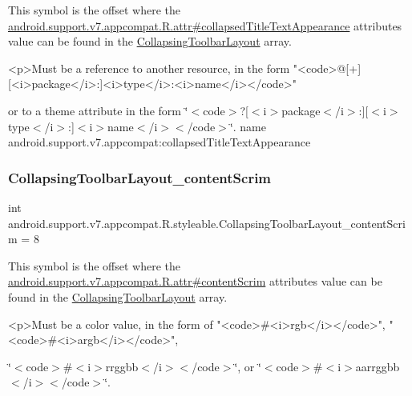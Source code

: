 This symbol is the offset where the \hyperlink{classandroid_1_1support_1_1v7_1_1appcompat_1_1R_1_1attr_af75636f95be73b48d5c2fc97f0f5cba5}{android.\+support.\+v7.\+appcompat.\+R.\+attr\#collapsed\+Title\+Text\+Appearance} attribute\textquotesingle{}s value can be found in the \hyperlink{classandroid_1_1support_1_1v7_1_1appcompat_1_1R_1_1styleable_a8d282d917f35e5a08dd37db243410383}{Collapsing\+Toolbar\+Layout} array.

\begin{DoxyVerb}      <p>Must be a reference to another resource, in the form "<code>@[+][<i>package</i>:]<i>type</i>:<i>name</i></code>"
\end{DoxyVerb}
 or to a theme attribute in the form \char`\"{}$<$code$>$?\mbox{[}$<$i$>$package$<$/i$>$\+:\mbox{]}\mbox{[}$<$i$>$type$<$/i$>$\+:\mbox{]}$<$i$>$name$<$/i$>$$<$/code$>$\char`\"{}.  name android.\+support.\+v7.\+appcompat\+:collapsed\+Title\+Text\+Appearance \mbox{\label{classandroid_1_1support_1_1v7_1_1appcompat_1_1R_1_1styleable_a9bd6e1eb8c17d8f0f33567b77c829a5a}} 
\subsubsection{\texorpdfstring{Collapsing\+Toolbar\+Layout\+\_\+content\+Scrim}{CollapsingToolbarLayout\_contentScrim}}
{\footnotesize\ttfamily int android.\+support.\+v7.\+appcompat.\+R.\+styleable.\+Collapsing\+Toolbar\+Layout\+\_\+content\+Scrim = 8\hspace{0.3cm}{\ttfamily [static]}}

This symbol is the offset where the \hyperlink{classandroid_1_1support_1_1v7_1_1appcompat_1_1R_1_1attr_ab524c966b3d2b0e493bd1b4a72aca159}{android.\+support.\+v7.\+appcompat.\+R.\+attr\#content\+Scrim} attribute\textquotesingle{}s value can be found in the \hyperlink{classandroid_1_1support_1_1v7_1_1appcompat_1_1R_1_1styleable_a8d282d917f35e5a08dd37db243410383}{Collapsing\+Toolbar\+Layout} array.

\begin{DoxyVerb}      <p>Must be a color value, in the form of "<code>#<i>rgb</i></code>", "<code>#<i>argb</i></code>",
\end{DoxyVerb}
 \char`\"{}$<$code$>$\#$<$i$>$rrggbb$<$/i$>$$<$/code$>$\char`\"{}, or \char`\"{}$<$code$>$\#$<$i$>$aarrggbb$<$/i$>$$<$/code$>$\char`\"{}. 

